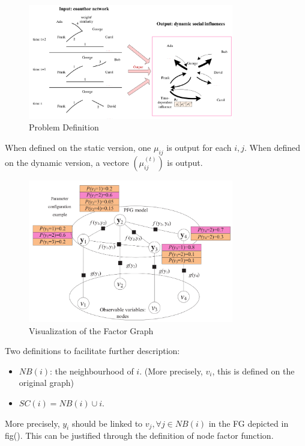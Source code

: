 \documentclass[11pt,a4paper]{article}
\begin{document}
\begin{figure}[htb]
\centering
	\includegraphics[width=0.8\textwidth]{fig/wang2011-problem.png}
	\caption{Problem Definition}
\end{figure}

When defined on the static version, one $\mu_{ij}$ is output for 
each $i,j$. When defined on the dynamic version, a vectore
$(\mu^{(t)}_{ij})$ is output. 

\begin{figure}[htb]
\centering
	\includegraphics[width=0.8\textwidth]{fig/wang2011-FG-vis.png}
	\caption{Visualization of the Factor Graph}
\end{figure}

Two definitions to facilitate further description:
\begin{itemize}
	\item $NB(i)$: the neighbourhood of $i$. (More precisely, 
	$v_i$, this is defined on the original graph)
	\item $SC(i) = NB(i) \cup i$. 
\end{itemize} 

More precisely, $y_i$ should be linked to $v_j, \forall j \in NB(i)$
in the FG depicted in fig(). This can be justified through the definition
of node factor function. 
\end{document}
